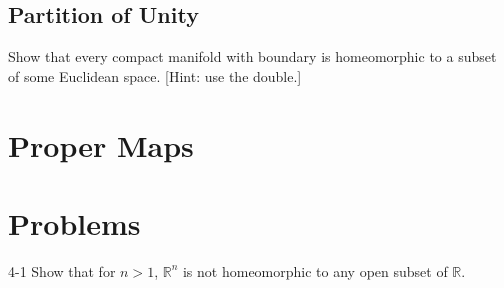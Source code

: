 \subsection*{Partition of Unity}

\begin{exercise}{4.87}
	Show that every compact manifold with boundary is homeomorphic to a subset of some Euclidean space. [Hint: use the double.]
\end{exercise}

\section*{Proper Maps}

\section*{Problems}

\begin{problem}{4-1}\label{problem:4-1}
Show that for $n > 1$, $\mathbb{R}^{n}$ is not homeomorphic to any open subset of $\mathbb{R}$.
\end{problem}

